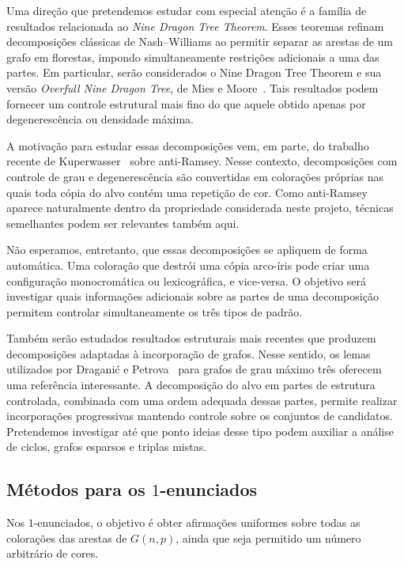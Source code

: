 \documentclass[11pt,a4paper]{article}
\newcommand{\Gnp}{G(n,p)}
\theoremstyle{plain}
\theoremstyle{definition}
\begin{document}
Uma direção que pretendemos estudar com especial atenção é a família
de resultados relacionada ao \emph{Nine Dragon Tree Theorem}. Esses
teoremas refinam decomposições clássicas de Nash--Williams ao permitir
separar as arestas de um grafo em florestas, impondo simultaneamente
restrições adicionais a uma das partes. Em particular, serão
considerados o Nine Dragon Tree Theorem e sua versão
\emph{Overfull Nine Dragon Tree}, de Mies e Moore~\cite{MMONDT}.
Tais resultados podem fornecer um controle estrutural mais fino do
que aquele obtido apenas por degenerescência ou densidade máxima.

A motivação para estudar essas decomposições vem, em parte, do trabalho
recente de Kuperwasser~\cite{Kup} sobre anti-Ramsey. Nesse contexto,
decomposições com controle de grau e degenerescência são convertidas
em colorações próprias nas quais toda cópia do alvo contém uma
repetição de cor. Como anti-Ramsey aparece naturalmente dentro da
propriedade considerada neste projeto, técnicas semelhantes podem ser
relevantes também aqui.

Não esperamos, entretanto, que essas decomposições se apliquem de forma
automática. Uma coloração que destrói uma cópia arco-íris pode criar
uma configuração monocromática ou lexicográfica, e vice-versa. O
objetivo será investigar quais informações adicionais sobre as partes
de uma decomposição permitem controlar simultaneamente os três tipos
de padrão.

Também serão estudados resultados estruturais mais recentes que
produzem decomposições adaptadas à incorporação de grafos. Nesse
sentido, os lemas utilizados por Draganić e Petrova~\cite{DP} para
grafos de grau máximo três oferecem uma referência interessante.
A decomposição do alvo em partes de estrutura controlada, combinada
com uma ordem adequada dessas partes, permite realizar incorporações
progressivas mantendo controle sobre os conjuntos de candidatos.
Pretendemos investigar até que ponto ideias desse tipo podem auxiliar
a análise de ciclos, grafos esparsos e triplas mistas.


\subsection{Métodos para os \texorpdfstring{$1$}{1}-enunciados}


Nos $1$-enunciados, o objetivo é obter afirmações uniformes sobre
todas as colorações das arestas de $\Gnp$, ainda que seja permitido
um número arbitrário de cores.
\end{document}
